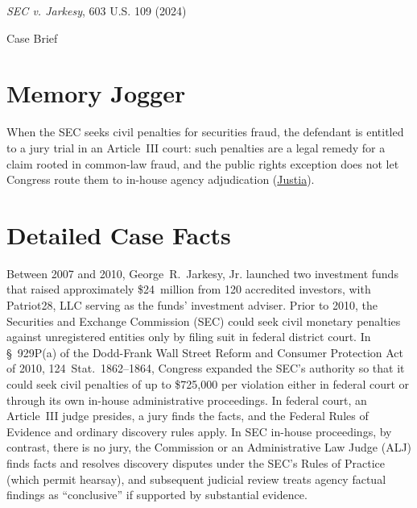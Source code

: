 \documentclass[12pt]{article}
\begin{document}
\begin{center}
{\LARGE \textit{SEC v. Jarkesy}, 603 U.S. 109 (2024)\par}
\vspace{0.8em}
{\large Case Brief\par}
\end{center}
\vspace{1em}

\section{Memory Jogger}
When the SEC seeks civil penalties for securities fraud, the defendant is entitled to a jury trial in an Article~III court: such penalties are a legal remedy for a claim rooted in common-law fraud, and the public rights exception does not let Congress route them to in-house agency adjudication (\href{https://supreme.justia.com/cases/federal/us/603/22-859/}{Justia}).

\section{Detailed Case Facts}
Between 2007 and 2010, George~R.~Jarkesy, Jr. launched two investment funds that raised approximately \$24~million from 120 accredited investors, with Patriot28, LLC serving as the funds' investment adviser. Prior to 2010, the Securities and Exchange Commission (SEC) could seek civil monetary penalties against unregistered entities only by filing suit in federal district court. In \S~929P(a) of the Dodd-Frank Wall Street Reform and Consumer Protection Act of 2010, 124~Stat.~1862--1864, Congress expanded the SEC's authority so that it could seek civil penalties of up to \$725,000 per violation either in federal court or through its own in-house administrative proceedings. In federal court, an Article~III judge presides, a jury finds the facts, and the Federal Rules of Evidence and ordinary discovery rules apply. In SEC in-house proceedings, by contrast, there is no jury, the Commission or an Administrative Law Judge (ALJ) finds facts and resolves discovery disputes under the SEC's Rules of Practice (which permit hearsay), and subsequent judicial review treats agency factual findings as ``conclusive'' if supported by substantial evidence.
\end{document}

